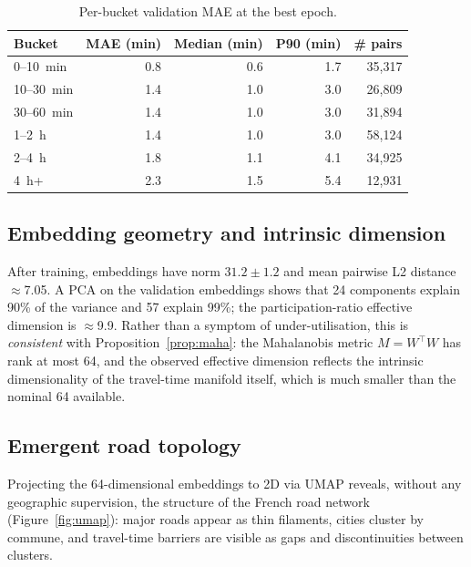 \documentclass[11pt,a4paper]{article}
\begin{document}
\begin{table}[h]
\centering
\caption{Per-bucket validation MAE at the best epoch.}
\label{tab:buckets}
\begin{tabular}{lrrrr}
\toprule
Bucket & MAE (min) & Median (min) & P90 (min) & \# pairs \\
\midrule
0--10~min  & 0.8 & 0.6 & 1.7 & 35{,}317 \\
10--30~min & 1.4 & 1.0 & 3.0 & 26{,}809 \\
30--60~min & 1.4 & 1.0 & 3.0 & 31{,}894 \\
1--2~h     & 1.4 & 1.0 & 3.0 & 58{,}124 \\
2--4~h     & 1.8 & 1.1 & 4.1 & 34{,}925 \\
4~h+       & 2.3 & 1.5 & 5.4 & 12{,}931 \\
\bottomrule
\end{tabular}
\end{table}

\subsection{Embedding geometry and intrinsic dimension}
After training, embeddings have norm $31.2 \pm 1.2$ and mean pairwise
L2 distance $\approx$7.05. A PCA on the validation embeddings shows
that 24 components explain 90\% of the variance and 57 explain 99\%;
the participation-ratio effective dimension is $\approx$9.9. Rather
than a symptom of under-utilisation, this is \emph{consistent} with
Proposition~\ref{prop:maha}: the Mahalanobis metric $M = W^{\top} W$
has rank at most 64, and the observed effective dimension reflects
the intrinsic dimensionality of the travel-time manifold itself,
which is much smaller than the nominal 64 available.

\subsection{Emergent road topology}
Projecting the 64-dimensional embeddings to 2D via UMAP reveals,
without any geographic supervision, the structure of the French road
network (Figure~\ref{fig:umap}): major roads appear as thin
filaments, cities cluster by commune, and travel-time barriers are
visible as gaps and discontinuities between clusters.
\end{document}
